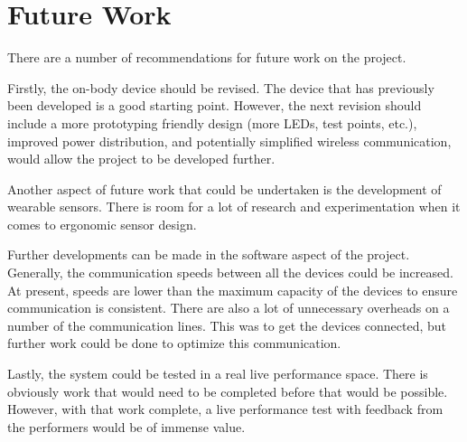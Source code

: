 \chapter{Future Work}
There are a number of recommendations for future work on the project.

Firstly, the on-body device should be revised.
The device that has previously been developed is a good starting point.
However, the next revision should include a more prototyping friendly design (more LEDs, test points, etc.),
improved power distribution, and potentially simplified wireless communication,
would allow the project to be developed further.

Another aspect of future work that could be undertaken is the development of wearable sensors.
There is room for a lot of research and experimentation when it comes to ergonomic sensor design.

Further developments can be made in the software aspect of the project.
Generally, the communication speeds between all the devices could be increased.
At present, speeds are lower than the maximum capacity of the devices to ensure communication is consistent.
There are also a lot of unnecessary overheads on a number of the communication lines.
This was to get the devices connected, but further work could be done to optimize this communication.

Lastly, the system could be tested in a real live performance space.
There is obviously work that would need to be completed before that would be possible.
However, with that work complete, a live performance test with feedback from the performers would be of immense value.
